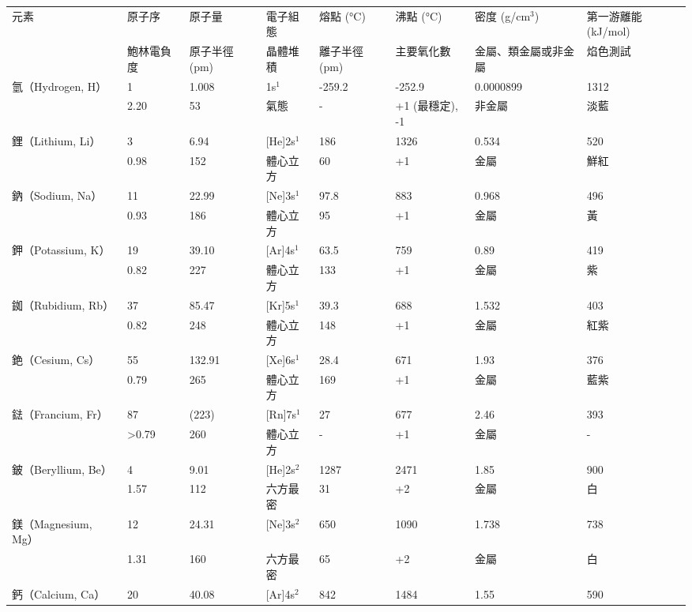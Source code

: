 \documentclass[a4paper,12pt]{report}
\begin{document}
\begin{longtable}[c]{|p{}|p{}|p{}|p{}|p{}|p{}|p{}|p{}|}
\hline
元素 & 原子序 & 原子量 & 電子組態 & 熔點 (°C) & 沸點 (°C) & 密度 (g/cm$^3$) & 第一游離能 (kJ/mol)\\\cline{2-8}
& 鮑林電負度 & 原子半徑 (pm) & 晶體堆積 & 離子半徑 (pm) & 主要氧化數 & 金屬、類金屬或非金屬 & 焰色測試\\\hline
\endhead
氫（Hydrogen, H） & 1 & 1.008 & 1s$^1$ & -259.2 & -252.9 & 0.0000899 & 1312\\\cline{2-8}
& 2.20 & 53 & 氣態 & - & +1 (最穩定), -1 & 非金屬 & 淡藍\\\hline
鋰（Lithium, Li） & 3 & 6.94 & [He]2s$^1$ & 186 & 1326 & 0.534 & 520\\\cline{2-8}
& 0.98 & 152 & 體心立方 & 60 & +1 & 金屬 & 鮮紅\\\hline
鈉（Sodium, Na） & 11 & 22.99 & [Ne]3s$^1$ & 97.8 & 883 & 0.968 & 496\\\cline{2-8}
& 0.93 & 186 & 體心立方 & 95 & +1 & 金屬 & 黃\\\hline
鉀（Potassium, K） & 19 & 39.10 & [Ar]4s$^1$ & 63.5 & 759 & 0.89 & 419\\\cline{2-8}
& 0.82 & 227 & 體心立方 & 133 & +1 & 金屬 & 紫\\\hline
銣（Rubidium, Rb） & 37 & 85.47 & [Kr]5s$^1$ & 39.3 & 688 & 1.532 & 403\\\cline{2-8}
& 0.82 & 248 & 體心立方 & 148 & +1 & 金屬 & 紅紫\\\hline
銫（Cesium, Cs） & 55 & 132.91 & [Xe]6s$^1$ & 28.4 & 671 & 1.93 & 376\\\cline{2-8}
& 0.79 & 265 & 體心立方 & 169 & +1 & 金屬 & 藍紫\\\hline
鍅（Francium, Fr） & 87 & (223) & [Rn]7s$^1$ & 27 & 677 & 2.46 & 393\\\cline{2-8}
& >0.79 & 260 & 體心立方 & - & +1 & 金屬 & -\\\hline
鈹（Beryllium, Be） & 4 & 9.01 & [He]2s$^2$ & 1287 & 2471 & 1.85 & 900\\\cline{2-8}
& 1.57 & 112 & 六方最密 & 31 & +2 & 金屬 & 白\\\hline
鎂（Magnesium, Mg） & 12 & 24.31 & [Ne]3s$^2$ & 650 & 1090 & 1.738 & 738\\\cline{2-8}
& 1.31 & 160 & 六方最密 & 65 & +2 & 金屬 & 白\\\hline
鈣（Calcium, Ca） & 20 & 40.08 & [Ar]4s$^2$ & 842 & 1484 & 1.55 & 590\\\cline{2-8}

\end{longtable}
\end{document}
